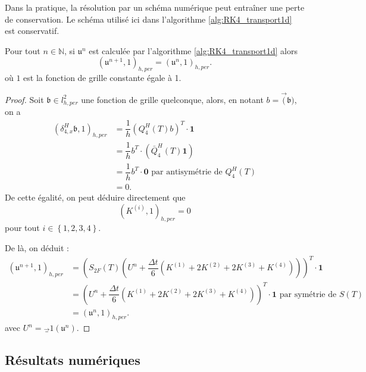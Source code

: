 Dans la pratique, la résolution par un schéma numérique peut entraîner une perte de conservation. 
Le schéma utilisé ici dans l'algorithme \ref{alg:RK4_transport1d} est conservatif.

\begin{proposition}
Pour tout $n \in \mathbb{N}$, si $\mathfrak{u}^n$ est calculée par l'algorithme \ref{alg:RK4_transport1d} alors
\begin{equation}
(\mathfrak{u}^{n+1}, \mathfrak{1})_{h,per} = (\mathfrak{u}^n, \mathfrak{1})_{h,per}.
\end{equation}
où $\mathfrak{1}$ est la fonction de grille constante égale à 1.
\end{proposition}

\begin{proof}
Soit $\mathfrak{b} \in l^2_{h,per}$ une fonction de grille quelconque, alors, en notant $b=\vec(\mathfrak{b})$, on a
\begin{align*}
(\delta_{4,x}^H \mathfrak{b}, \mathfrak{1})_{h,per} & = \dfrac{1}{h} \left( Q_4^H(T) b \right)^T \cdot \mathbf{1} \\
	& = \dfrac{1}{h} b^T \cdot (\bar{Q}_4^H(T) \mathbf{1}) \\
	& = \dfrac{1}{h} b^T \cdot \mathbf{0} \text{ par antisymétrie de }Q_4^H(T)\\
	& = 0.
\end{align*}
De cette égalité, on peut déduire directement que
\begin{equation}
(K^{(i)}, \mathfrak{1})_{h,per} = 0
\end{equation}
pour tout $i \in \left\lbrace 1, 2, 3, 4 \right\rbrace$.

De là, on déduit :
\begin{align*}
(\mathfrak{u}^{n+1},\mathfrak{1})_{h,per} & =  \left( S_{2F}(T) \left( U^n + \dfrac{\Delta t}{6}(K^{(1)}+2K^{(2)}+2K^{(3)}+K^{(4)})  \right) \right)^T \cdot \mathbf{1} \\
	& = \left( U^n + \dfrac{\Delta t}{6}(K^{(1)}+2K^{(2)}+2K^{(3)}+K^{(4)})  \right)^T \cdot \mathbf{1} \text{ par symétrie de } S(T)\\
	& = (\mathfrak{u}^n , \mathfrak{1})_{h,per}.
\end{align*}
avec $U^n = \vec_1(\mathfrak{u}^n)$.
\end{proof}

\subsection{Résultats numériques}

